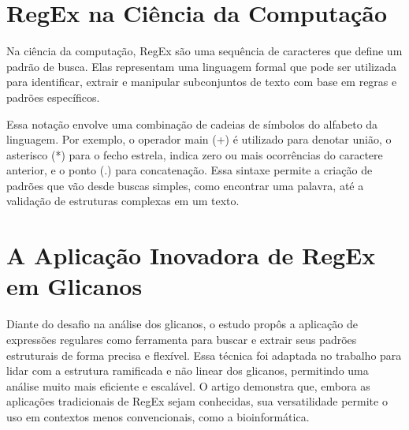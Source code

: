 \section{RegEx na Ciência da Computação}

Na ciência da computação, RegEx são uma sequência de caracteres que define um 
padrão de busca. Elas representam uma linguagem formal que pode ser utilizada 
para identificar, extrair e manipular subconjuntos de texto com base em regras e 
padrões específicos.

Essa notação envolve uma combinação de cadeias de símbolos do alfabeto da 
linguagem. Por exemplo, o operador main (+) é utilizado para denotar união, o 
asterisco (*) para o fecho estrela, indica zero ou mais ocorrências do caractere 
anterior, e o ponto (.) para concatenação. Essa sintaxe permite a criação de 
padrões que vão desde buscas simples, como encontrar uma palavra, até a validação 
de estruturas complexas em um texto.

\section{A Aplicação Inovadora de RegEx em Glicanos}

Diante do desafio  na análise dos glicanos, o estudo propôs a aplicação de 
expressões regulares como ferramenta para buscar e extrair seus padrões estruturais 
de forma precisa e flexível. Essa técnica foi adaptada no trabalho para lidar com a 
estrutura ramificada e não linear dos glicanos, permitindo uma análise muito mais 
eficiente e escalável. O artigo demonstra que, embora as aplicações tradicionais de 
RegEx sejam conhecidas, sua versatilidade permite o uso em contextos menos 
convencionais, como a bioinformática.